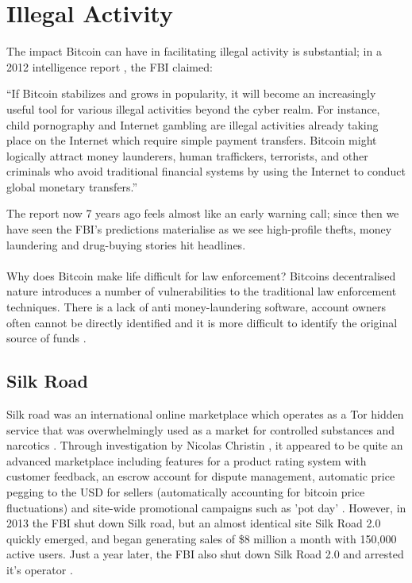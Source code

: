 \section{Illegal Activity}

The impact Bitcoin can have in facilitating illegal activity is substantial; in a 2012 intelligence report \cite{RefWorks:doc:5c4ad055e4b0ea619646c15a}, the FBI claimed: 

\begin{displayquote}
 ``If Bitcoin stabilizes and grows in popularity, it will become an increasingly useful tool for various illegal activities beyond the cyber realm. For instance, child pornography and Internet gambling are illegal activities already taking place on the Internet which require simple payment transfers. Bitcoin might logically attract money launderers, human traffickers, terrorists, and other criminals who avoid traditional financial systems by using the Internet to conduct global monetary transfers.''
\end{displayquote}

The report now 7 years ago feels almost like an early warning call; since then we have seen the FBI's predictions materialise as we see high-profile thefts, money laundering and drug-buying stories hit headlines. 
\\\\
Why does Bitcoin make life difficult for law enforcement? Bitcoins decentralised nature introduces a number of vulnerabilities to the traditional law enforcement techniques. There is a lack of anti money-laundering software, account owners often cannot be directly identified and it is more difficult to identify the original source of funds \cite{RefWorks:doc:5c4ad055e4b0ea619646c15a}. 

\subsection{Silk Road}
Silk road was an international online marketplace which operates as a Tor hidden service that was overwhelmingly used as a market for controlled substances and narcotics \cite{RefWorks:doc:5c3e0105e4b0854ae612621e}. Through investigation by Nicolas Christin \cite{RefWorks:doc:5c3e0105e4b0854ae612621e}, it appeared to be quite an advanced marketplace including features for a product rating system with customer feedback, an escrow account for dispute management, automatic price pegging to the USD for sellers (automatically accounting for bitcoin price fluctuations) and site-wide promotional campaigns such as 'pot day' \cite{RefWorks:doc:5c3e0105e4b0854ae612621e}. However, in 2013 the FBI shut down Silk road, but an almost identical site Silk Road 2.0 quickly emerged, and began generating sales of \$8 million a month with 150,000 active users. Just a year later, the FBI also shut down Silk Road 2.0 and arrested it's operator \cite{RefWorks:doc:5c4ae400e4b0613d0cdbb201}. 

